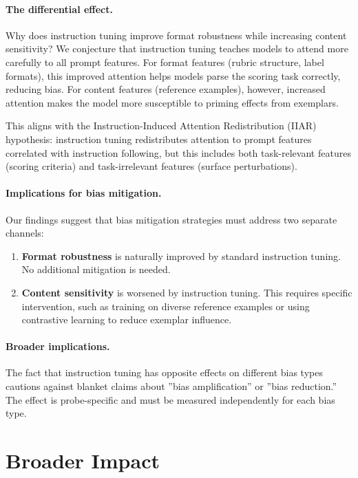 \documentclass[11pt]{article}
\begin{document}
\paragraph{The differential effect.} Why does instruction tuning improve format robustness while increasing content sensitivity? We conjecture that instruction tuning teaches models to attend more carefully to all prompt features. For format features (rubric structure, label formats), this improved attention helps models parse the scoring task correctly, reducing bias. For content features (reference examples), however, increased attention makes the model more susceptible to priming effects from exemplars.

This aligns with the Instruction-Induced Attention Redistribution (IIAR) hypothesis: instruction tuning redistributes attention to prompt features correlated with instruction following, but this includes both task-relevant features (scoring criteria) and task-irrelevant features (surface perturbations).

\paragraph{Implications for bias mitigation.} Our findings suggest that bias mitigation strategies must address two separate channels:
\begin{enumerate}
    \item \textbf{Format robustness} is naturally improved by standard instruction tuning. No additional mitigation is needed.
    \item \textbf{Content sensitivity} is worsened by instruction tuning. This requires specific intervention, such as training on diverse reference examples or using contrastive learning to reduce exemplar influence.
\end{enumerate}

\paragraph{Broader implications.} The fact that instruction tuning has opposite effects on different bias types cautions against blanket claims about ''bias amplification'' or ''bias reduction.'' The effect is probe-specific and must be measured independently for each bias type.

\section{Broader Impact}
\end{document}
